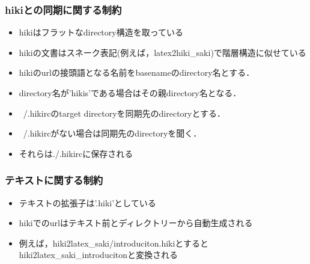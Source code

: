 \subsubsection{hikiとの同期に関する制約}
\begin{itemize}
\item hikiはフラットなdirectory構造を取っている
\item hikiの文書はスネーク表記(例えば，latex2hiki\_saki)で階層構造に似せている
\item hikiのurlの接頭語となる名前をbasenameのdirectory名とする．
\item directory名が'hikis'である場合はその親directory名となる．
\item ~/.hikircのtarget directoryを同期先のdirectoryとする．
\item ~/.hikircがない場合は同期先のdirectoryを聞く．
\item それらは./.hikircに保存される
\end{itemize}
\subsubsection{テキストに関する制約}
\begin{itemize}
\item テキストの拡張子は'.hiki'としている
\item hikiでのurlはテキスト前とディレクトリーから自動生成される
\item 例えば，hiki2latex\_saki/introduciton.hikiとするとhiki2latex\_saki\_introducitonと変換される
\end{itemize}

